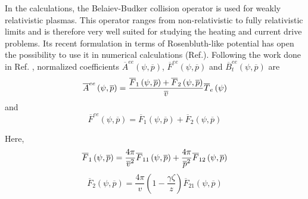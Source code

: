 In the calculations, the Belaiev-Budker collision operator is used for
weakly relativistic plasmas. This operator ranges from non-relativistic to
fully relativistic limits and is therefore very well suited for studying the
heating and current drive problems. Its recent formulation in terms of
Rosenbluth-like potential has open the possibility to use it in numerical
calculations (Ref.\cite{bra89}). Following the work done in Ref. \cite{shk97}
, normalized coefficients $\overline{A}^{ee}\left( \psi ,\overline{p}\right)
$, $\overline{F}^{ee}\left( \psi ,\overline{p}\right) $ and $\overline{B}%
_{t}^{ee}\left( \psi ,\overline{p}\right) $ are
\begin{equation}
\overline{A}^{ee}\left( \psi ,\overline{p}\right) =\frac{\overline{F}%
_{1}\left( \psi ,\overline{p}\right) +\overline{F}_{2}\left( \psi ,\overline{%
p}\right) }{\overline{v}}\overline{T}_{e}\left( \psi \right)
\end{equation}
and
\begin{equation}
\overline{F}^{ee}\left( \psi ,\overline{p}\right) =\overline{F}_{1}\left(
\psi ,\overline{p}\right) +\overline{F}_{2}\left( \psi ,\overline{p}\right)
\end{equation}

Here,
\begin{equation}
\overline{F}_{1}\left( \psi ,\overline{p}\right) =\frac{4\pi }{\overline{v}%
^{2}}\overline{F}_{11}\left( \psi ,\overline{p}\right) +\frac{4\pi }{%
\overline{p}^{2}}\overline{F}_{12}\left( \psi ,\overline{p}\right)
\end{equation}
\begin{equation}
\overline{F}_{2}\left( \psi ,\overline{p}\right) =\frac{4\pi }{v}\left( 1-%
\frac{\gamma \zeta }{z}\right) \overline{F}_{21}\left( \psi ,\overline{p}
\right)
\end{equation}

